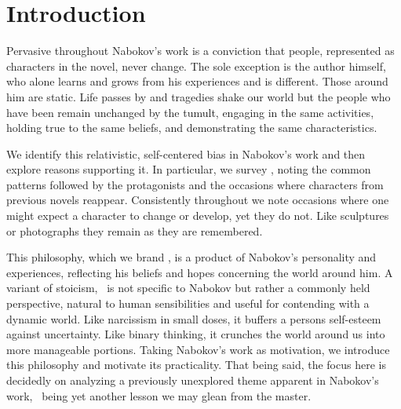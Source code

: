 \section{Introduction}
\label{intro}

Pervasive throughout Nabokov's work is a conviction that people, represented as characters in the novel, never change. 
The sole exception is the author himself, who alone learns and grows from his experiences and is different.
Those around him are static.
Life passes by and tragedies shake our world but the people who have been remain unchanged by the tumult, engaging in the same activities, holding true to the same beliefs, and demonstrating the same characteristics.

We identify this relativistic, self-centered bias in Nabokov's work and then explore reasons supporting it.
In particular, we survey , noting the common patterns followed by the protagonists and the occasions where characters from previous novels reappear.
Consistently throughout we note occasions where one might expect a character to change or develop, yet they do not.
Like sculptures or photographs they remain as they are remembered.

This philosophy, which we brand \emph{\philo}, is a product of Nabokov's personality and experiences, reflecting his beliefs and hopes concerning the world around him.
A variant of stoicism, \philo~is not specific to Nabokov but rather a commonly held perspective, natural to human sensibilities and useful for contending with a dynamic world.
Like narcissism in small doses, it buffers a persons self-esteem against uncertainty.
Like binary thinking, it crunches the world around us into more manageable portions.
Taking Nabokov's work as motivation, we introduce this philosophy and motivate its practicality.
That being said, the focus here is decidedly on analyzing a previously unexplored theme apparent in Nabokov's work, \philo~being yet another lesson we may glean from the master.

